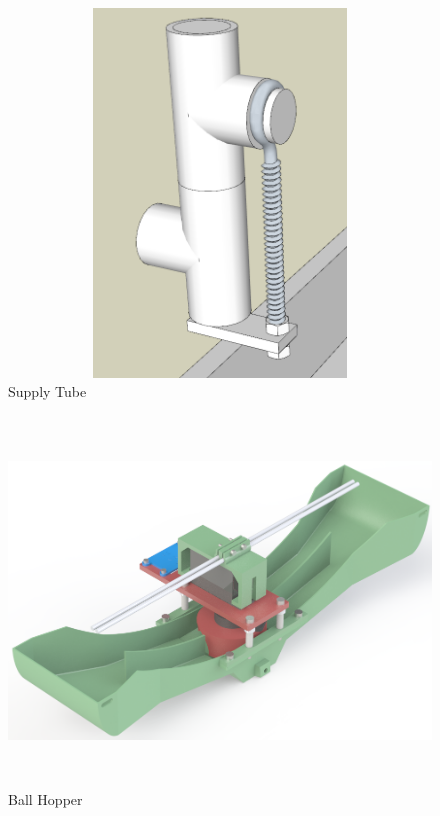 \begin{figure}[H]   %
	\centering \includegraphics[width=6in, height=3.85in, keepaspectratio]{figures/supply_tubes.png}
	\caption{Supply Tube}	\label{fig:supply_tubes}
\end{figure}
\begin{figure}[H]   %
	\centering \includegraphics[width=6in, height=3.85in, keepaspectratio]{figures/ball_hopper.png}
	\caption{Ball Hopper}	\label{fig:ball_hopper}
\end{figure}
